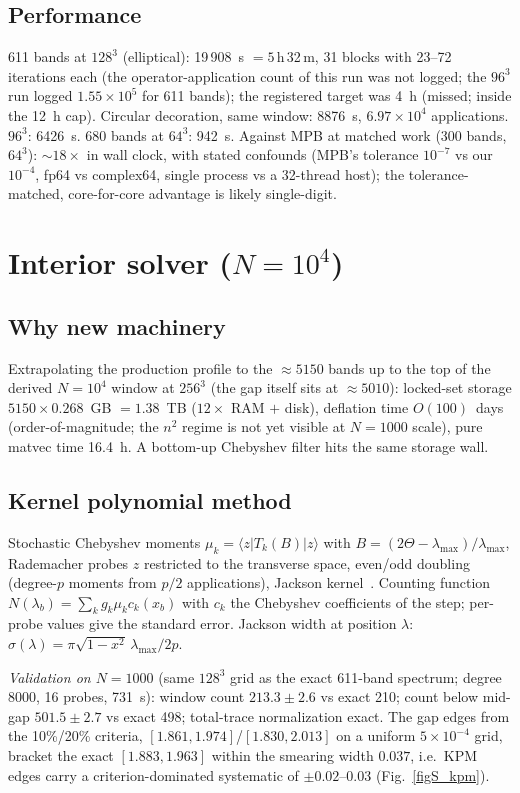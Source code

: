 \documentclass[aps,prl,preprint,superscriptaddress,longbibliography,nofootinbib]{revtex4-2}
\begin{document}
\subsection{Performance}
611 bands at $128^3$ (elliptical): 19\,908~s $=5$\,h\,32\,m, 31 blocks with 23--72 iterations each (the operator-application count of this run was not logged; the $96^3$ run logged $1.55\times10^{5}$ for 611 bands); the registered target was 4~h (missed; inside the 12~h cap). Circular decoration, same window: 8876~s, $6.97\times10^{4}$ applications. $96^3$: 6426~s. 680 bands at $64^3$: 942~s. Against MPB at matched work (300 bands, $64^3$): $\sim18\times$ in wall clock, with stated confounds (MPB's tolerance $10^{-7}$ vs our $10^{-4}$, fp64 vs complex64, single process vs a 32-thread host); the tolerance-matched, core-for-core advantage is likely single-digit.

\section{Interior solver ($N=10^4$)}
\subsection{Why new machinery}
Extrapolating the production profile to the $\approx5150$ bands up to the top of the derived $N=10^4$ window at $256^3$ (the gap itself sits at $\approx5010$): locked-set storage $5150\times0.268$~GB $=1.38$~TB ($12\times$ RAM $+$ disk), deflation time $O(100)$~days (order-of-magnitude; the $n^2$ regime is not yet visible at $N=1000$ scale), pure matvec time 16.4~h. A bottom-up Chebyshev filter hits the same storage wall.

\subsection{Kernel polynomial method}
Stochastic Chebyshev moments $\mu_k=\langle z|T_k(B)|z\rangle$ with $B=(2\Theta-\lambda_{\max})/\lambda_{\max}$, Rademacher probes $z$ restricted to the transverse space, even/odd doubling (degree-$p$ moments from $p/2$ applications), Jackson kernel~\cite{Weisse2006}. Counting function $N(\lambda_b)=\sum_k g_k\mu_k c_k(x_b)$ with $c_k$ the Chebyshev coefficients of the step; per-probe values give the standard error. Jackson width at position $\lambda$: $\sigma(\lambda)=\pi\sqrt{1-x^2}\,\lambda_{\max}/2p$.

\emph{Validation on $N=1000$} (same $128^3$ grid as the exact 611-band spectrum; degree 8000, 16 probes, 731~s): window count $213.3\pm2.6$ vs exact 210; count below mid-gap $501.5\pm2.7$ vs exact 498; total-trace normalization exact. The gap edges from the 10\%/20\% criteria, $[1.861,1.974]$/$[1.830,2.013]$ on a uniform $5\times10^{-4}$ grid, bracket the exact $[1.883,1.963]$ within the smearing width $0.037$, i.e.\ KPM edges carry a criterion-dominated systematic of $\pm0.02$--$0.03$ (Fig.~\ref{figS_kpm}).
\end{document}
